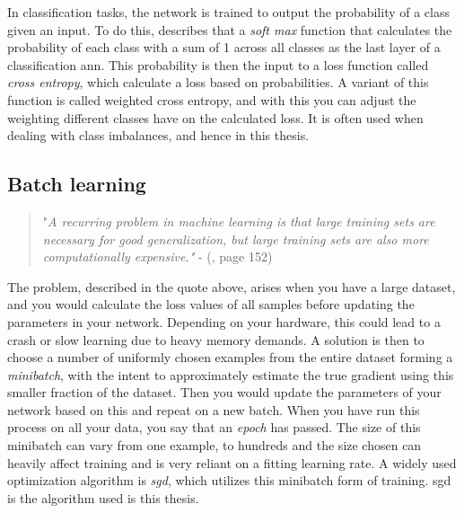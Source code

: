     In classification tasks, the network is trained to output the probability of a class given an input. To do this, \citeauthor{zhou2019mpce_cross_entropy}\cite{zhou2019mpce_cross_entropy} describes that a \textit{soft max} function that calculates the probability of each class with a sum of 1 across all classes as the last layer of a classification \gls{ann}. This probability is then the input to a loss function called \textit{cross entropy}, which calculate a loss based on probabilities. A variant of this function is called weighted cross entropy\cite{ho2019real_weighted_cross_entropy}, and with this you can adjust the weighting different classes have on the calculated loss. It is often used when dealing with class imbalances, and hence in this thesis.
    
    

\subsection{Batch learning} \label{batch learning}
        \begin{quote}
        "\textit{A recurring problem in machine learning is that large training sets are necessary for good generalization, but large training sets are also more computationally
        expensive."} - (\citeauthor{Goodfellow-et-al-2016_SGD}\citeyear{Goodfellow-et-al-2016_SGD}, page 152)
    \end{quote}
    
    The problem, described in the quote above, arises when you have a large dataset, and you would calculate the loss values of all samples before updating the parameters in your network\cite{Goodfellow-et-al-2016_SGD}. Depending on your hardware, this could lead to a crash or slow learning due to heavy memory demands. A solution is then to choose a number of uniformly chosen examples from the entire dataset forming a \textit{minibatch}, with the intent to approximately estimate the true gradient using this smaller fraction of the dataset. Then you would update the parameters of your network based on this and repeat on a new batch. When you have run this process on all your data, you say that an \textit{epoch} has passed. The size of this minibatch can vary from one example, to hundreds and the size chosen can heavily affect training and is very reliant on a fitting learning rate\cite{wilson2001need_learning_rate}. A widely used optimization algorithm is \textit{\gls{sgd}}\cite{Goodfellow-et-al-2016_SGD}, which utilizes this minibatch form of training. \gls{sgd} is the algorithm used is this thesis.
    
